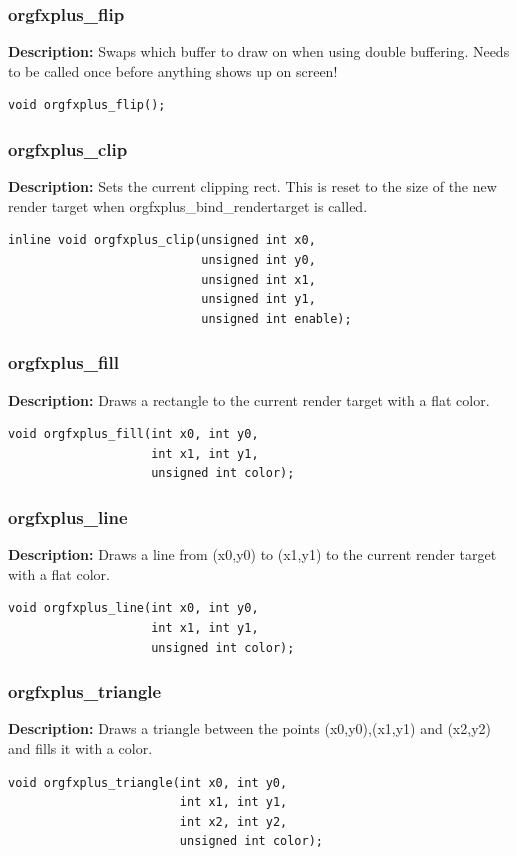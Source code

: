 \documentclass[10pt,a4paper]{article}
\begin{document}
\subsubsection{orgfxplus\_flip}
\textbf{Description:} Swaps which buffer to draw on when using double buffering. Needs to be called once before anything shows up on screen!
\begin{lstlisting}
void orgfxplus_flip();
\end{lstlisting}

\subsubsection{orgfxplus\_clip}
\textbf{Description:} Sets the current clipping rect. This is reset to the size of the new render target when orgfxplus\_bind\_rendertarget is called.
\begin{lstlisting}
inline void orgfxplus_clip(unsigned int x0,
                           unsigned int y0,
                           unsigned int x1,
                           unsigned int y1,
                           unsigned int enable);
\end{lstlisting}

\subsubsection{orgfxplus\_fill}
\textbf{Description:} Draws a rectangle to the current render target with a flat color.
\begin{lstlisting}
void orgfxplus_fill(int x0, int y0,
                    int x1, int y1,
                    unsigned int color);
\end{lstlisting}

\subsubsection{orgfxplus\_line}
\textbf{Description:} Draws a line from (x0,y0) to (x1,y1) to the current render target with a flat color.
\begin{lstlisting}
void orgfxplus_line(int x0, int y0,
                    int x1, int y1,
                    unsigned int color);
\end{lstlisting}

\subsubsection{orgfxplus\_triangle}
\textbf{Description:} Draws a triangle between the points (x0,y0),(x1,y1) and (x2,y2) and fills it with a color.
\begin{lstlisting}
void orgfxplus_triangle(int x0, int y0, 
                        int x1, int y1, 
                        int x2, int y2, 
                        unsigned int color);
\end{lstlisting}
\end{document}
